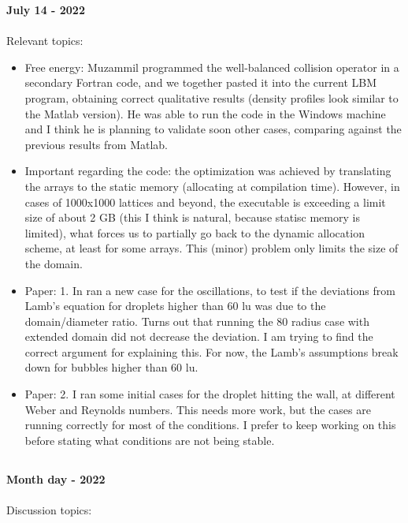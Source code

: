 \documentclass[8pt]{beamer}
\begin{document}
	\begin{frame}{}
		\textbf{July 14 - 2022}\\~\\
		Relevant topics:
		\begin{itemize}
			\item Free energy: Muzammil programmed the well-balanced collision operator in a secondary Fortran code, and we together pasted it into the current LBM program, obtaining correct qualitative results (density profiles look similar to the Matlab version). He was able to run the code in the Windows machine and I think he is planning to validate soon other cases, comparing against the previous results from Matlab.
			
			\item Important regarding the code: the optimization was achieved by translating the arrays to the static memory (allocating at compilation time). However, in cases of 1000x1000 lattices and beyond, the executable is exceeding a limit size of about 2 GB (this I think is natural, because statisc memory is limited), what forces us to partially go back to the dynamic allocation scheme, at least for some arrays. This (minor) problem only limits the size of the domain.
			
			\item Paper: 1. In ran a new case for the oscillations, to test if the deviations from Lamb's equation for droplets higher than 60 lu was due to the domain/diameter ratio. Turns out that running the 80 radius case with extended domain did not decrease the deviation. I am trying to find the correct argument for explaining this. For now, the Lamb's assumptions break down for bubbles higher than 60 lu.
			
			\item Paper: 2. I ran some initial cases for the droplet hitting the wall, at different Weber and Reynolds numbers. This needs more work, but the cases are running correctly for most of the conditions. I prefer to keep working on this before stating what conditions are not being stable. 
		\end{itemize}
	\end{frame}
	\subsection{}
	\label{}
	\justifying
	\begin{frame}{}
		\textbf{Month day - 2022}\\~\\
		Discussion topics:
	\end{frame}
	
\end{document}

